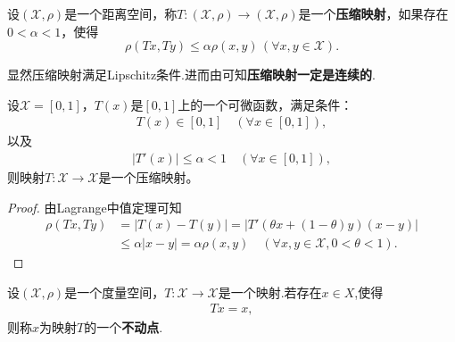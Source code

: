 \documentclass[../../main.tex]{subfiles}%
\begin{document}
\begin{definition}
设$(\mathscr{X},\rho)$是一个距离空间，称$T:(\mathscr{X},\rho) \to (\mathscr{X},\rho)$是一个\textbf{压缩映射}，如果存在$0 < \alpha < 1$，使得$$\rho(Tx,Ty) \leqslant \alpha\rho(x,y)\,(\forall x,y \in \mathscr{X}).$$
\end{definition}
\begin{remark}
显然压缩映射满足Lipschitz条件.进而由可知\textbf{压缩映射一定是连续的}.
\end{remark}

\begin{example}
设$\mathscr{X} = [0,1]$，$T(x)$是$[0,1]$上的一个可微函数，满足条件：
\begin{align}
\label{eq:1.1.8}
T(x) \in [0,1] \quad (\forall x \in [0,1]),
\end{align}
以及
\begin{align}
\label{eq:1.1.9}
|T'(x)| \leqslant \alpha < 1 \quad (\forall x \in [0,1]),
\end{align}
则映射$T:\mathscr{X} \to \mathscr{X}$是一个压缩映射。
\end{example}
\begin{proof}

由Lagrange中值定理可知
\begin{align*}
\rho(Tx,Ty) &= |T(x) - T(y)|= |T'(\theta x + (1 - \theta)y)(x - y)| \\
&\leqslant \alpha|x - y| = \alpha\rho(x,y) \quad (\forall x,y \in \mathscr{X}, 0 < \theta < 1).
\end{align*}

\end{proof}

\begin{definition}[不动点]
设$(\mathscr{X},\rho)$是一个度量空间，$T:\mathscr{X}\to \mathscr{X}$是一个映射.若存在$x\in X$,使得
\begin{align*}
Tx=x,
\end{align*}
则称$x$为映射$T$的一个\textbf{不动点}.
\end{definition}
\end{document}
